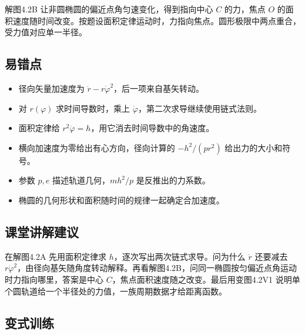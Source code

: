 \documentclass[UTF8,fontset=fandol,a4paper,11pt]{ctexart}
\begin{document}
解图4.2B 让非圆椭圆的偏近点角匀速变化，得到指向中心 $C$ 的力，焦点 $O$ 的面积速度随时间改变。按题设面积定律运动时，力指向焦点。圆形极限中两点重合，受力值对应单一半径。



\subsection*{易错点}

\begin{itemize}
\item 径向矢量加速度为 $\ddot r-r\dot\varphi^2$，后一项来自基矢转动。
\item 对 $r(\varphi)$ 求时间导数时，乘上 $\dot\varphi$，第二次求导继续使用链式法则。
\item 面积定律给 $r^2\dot\varphi=h$，用它消去时间导数中的角速度。
\item 横向加速度为零给出有心方向，径向计算的 $-h^2/(pr^2)$ 给出力的大小和符号。
\item 参数 $p,e$ 描述轨道几何，$mh^2/p$ 是反推出的力系数。
\item 椭圆的几何形状和面积随时间的规律一起确定合加速度。
\end{itemize}



\subsection*{课堂讲解建议}

在解图4.2A 先用面积定律求 $h$，逐次写出两次链式求导。问为什么 $\ddot r$ 还要减去 $r\dot\varphi^2$，由径向基矢随角度转动解释。再看解图4.2B，问同一椭圆按匀偏近点角运动时力指向哪里，答案是中心 $C$，焦点面积速度随之改变。最后用变图4.2V1 说明单个圆轨道给一个半径处的力值，一族周期数据才给距离函数。



\subsection*{变式训练}
\end{document}
